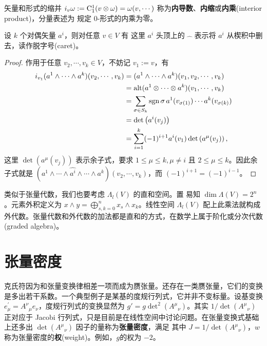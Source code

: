 \begin{definition}
    矢量和形式的缩并 $i_v \omega:=\mathrm{C}_1^1 (v\otimes\omega)=\omega(v,\cdots)$ 称为\textbf{内导数}、\textbf{内缩}或\textbf{内乘}(interior product)，分量表述为
    规定 $0$-形式的内乘为零。
\end{definition}
\begin{theorem}设 $k$ 个对偶矢量 $a^i$，则对任意 $v\in V$ 有
    这里 $a^i$ 头顶上的 $\widehat{\text{  }}$ 表示将 $a^i$ 从楔积中删去，读作脱字号(caret)。
\end{theorem}
\begin{proof}作用于任意 $v_2,\cdots,v_k\in V$，不妨记 $v_1:=v$，有
    \begin{align*}
        i_{v_1}(a^1\wedge \cdots\wedge a^k)(v_2,\cdots,v_k)&=(a^1\wedge \cdots\wedge a^k)(v_1,v_2,\cdots,v_k)\\
        &=\operatorname{alt}(a^1\otimes\cdots\otimes a^k)(v_1,\cdots,v_k)\\
        &=\sum_{\sigma\in S_k}\operatorname{sgn}\sigma\, a^1(v_{\sigma(1)})\cdots a^k(v_{\sigma(k)})\\
        &=\det\left(a^i(v_{j})\right)\\
        &=\sum_{i=1}^k (-1)^{i+1} a^i(v_1)\det\left(a^\mu(v_{j})\right),
    \end{align*}
    这里 $\det\left(a^\mu(v_{j})\right)$ 表示余子式，要求 $1\leqslant\mu\leqslant k,\mu\ne i$ 且 $2\leqslant\mu\leqslant k$。因此余子式就是 $(a^1 \wedge \cdots \wedge \widehat{a^i}\wedge \cdots \wedge a^k)(v_2,\cdots,v_k)$，而 $(-1)^{i+1}=(-1)^{i-1}$。
\end{proof}

类似于张量代数，我们也要考虑 $\Lambda_l(V)$ 的直和空间。置
易知 $\dim\Lambda(V)=2^n$。元素外积定义为 $x\wedge y=\bigoplus_{s,k=0}^n x_s\wedge x_k$。线性空间 $\Lambda_l(V)$ 配上此乘法就构成外代数。张量代数和外代数的加法都是直和的方式，在数学上属于阶化或分次代数(graded algebra)。

\section{张量密度}\label{sec:tensor-density}

克氏符因为和张量变换律相差一项而成为赝张量。还存在一类赝张量，它们的变换是多出若干系数。一个典型例子是某基的度规行列式，它并非不变标量。设基变换 $e_\mu^{\prime}=A^\nu{ }_\mu e_\nu$，度规行列式的变换显然为 $g'=g\det^2(A^\mu{}_\nu)$。其实 $1/\det(A^\mu{}_\nu)$ 正对应于 Jacobi 行列式，只是目前是在线性空间中讨论问题。在张量变换式基础上还多出 $\det(A^\mu{}_\nu)$ 因子的量称为\textbf{张量密度}，满足
其中 $J=1/\det(A^\mu{}_\nu)$，$w$ 称为张量密度的\textbf{权}(weight)。例如，$g$的权为 $-2$。

